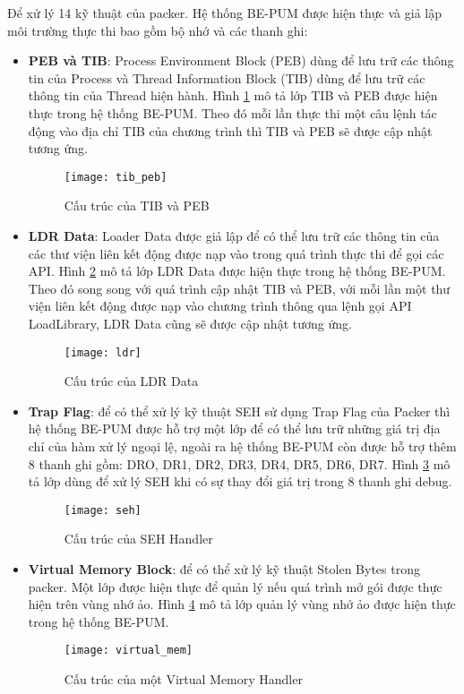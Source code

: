 \hspace{0.5cm}Để xử lý 14 kỹ thuật của packer. Hệ thống BE-PUM được hiện thực và giả lập môi trường thực thi bao gồm bộ nhớ và các thanh ghi:
\begin{itemize}
\item{\textbf{PEB và TIB}: Process Environment Block (PEB) dùng để lưu trữ các thông tin của Process và Thread Information Block (TIB) dùng để lưu trữ các thông tin của Thread hiện hành. Hình \ref {fig:TIBPEBArchi} mô tả lớp TIB và PEB được hiện thực trong hệ thống BE-PUM. Theo đó mỗi lần thực thi một câu lệnh tác động vào địa chỉ TIB của chương trình thì TIB và PEB sẽ được cập nhật tương ứng.
\begin{figure}
\centering
\texttt{[image: tib\_peb]}
\caption{Cấu trúc của TIB và PEB}
\label{fig:TIBPEBArchi}
\end{figure}
}
\item{\textbf{LDR Data}: Loader Data được giả lập để có thể lưu trữ các thông tin của các thư viện liên kết động được nạp vào trong quá trình thực thi để gọi các API. Hình \ref {fig:LDRArchi} mô tả lớp LDR Data được hiện thực trong hệ thống BE-PUM. Theo đó song song với quá trình cập nhật TIB và PEB, với mỗi lần một thư viện liên kết động được nạp vào chương trình thông qua lệnh gọi API LoadLibrary, LDR Data cũng sẽ được cập nhật tương ứng.
\begin{figure}
\centering
\texttt{[image: ldr]}
\caption{Cấu trúc của LDR Data}
\label{fig:LDRArchi}
\end{figure}
}
\item{\textbf{Trap Flag}: để có thể xử lý kỹ thuật SEH sử dụng Trap Flag của Packer thì hệ thống BE-PUM được hỗ trợ một lớp để có thể lưu trữ những giá trị địa chỉ của hàm xử lý ngoại lệ, ngoài ra hệ thống BE-PUM còn được hỗ trợ thêm 8 thanh ghi gồm: DRO, DR1, DR2, DR3, DR4, DR5, DR6, DR7. Hình \ref {fig:SEHHandlerArchi} mô tả lớp dùng để xử lý SEH khi có sự thay đổi giá trị trong 8 thanh ghi debug.
\begin{figure}
\centering
\texttt{[image: seh]}
\caption{Cấu trúc của SEH Handler}
\label{fig:SEHHandlerArchi}
\end{figure}
}
\item{\textbf{Virtual Memory Block}: để có thể xử lý kỹ thuật Stolen Bytes trong packer. Một lớp được hiện thực để quản lý nếu quá trình mở gói được thực hiện trên vùng nhớ ảo. Hình \ref {fig:VirtualMemArchi} mô tả lớp quản lý vùng nhớ ảo được hiện thực trong hệ thống BE-PUM.
\begin{figure}
\centering
\texttt{[image: virtual\_mem]}
\caption{Cấu trúc của một Virtual Memory Handler}
\label{fig:VirtualMemArchi}
\end{figure}
}
\end{itemize}

